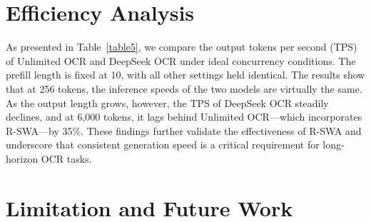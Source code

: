 \documentclass[11pt, a4paper, logo, copyright, nonumbering]{deepseek}
\begin{document}
\begin{CJK*}{UTF8}{gbsn}
\begin{table}[!t]\small
    \centering

    \caption{Theoretical inference performance ceiling comparison. We compare the TPS upper limits of DeepSeek OCR and Unlimited OCR across varying output lengths.}
    \setlength{\abovecaptionskip}{0.5cm}


	\label{table5}
    \end{table}



\section{Efficiency Analysis}
As presented in Table~\ref{table5}, we compare the output tokens per second (TPS) of Unlimited OCR and DeepSeek OCR under ideal concurrency conditions. The prefill length is fixed at 10, with all other settings held identical. The results show that at 256 tokens, the inference speeds of the two models are virtually the same. As the output length grows, however, the TPS of DeepSeek OCR steadily declines, and at 6,000 tokens, it lags behind Unlimited OCR—which incorporates R-SWA—by 35\%. These findings further validate the effectiveness of R-SWA and underscore that consistent generation speed is a critical requirement for long-horizon OCR tasks.




\section{Limitation and Future Work}


\end{CJK*}
\end{document}
